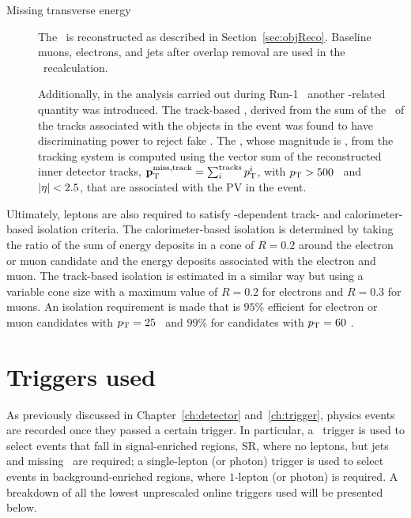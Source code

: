 \begin{description}
			\item[Missing transverse energy]
				The \met\ is reconstructed as described in Section~\ref{sec:objReco}. Baseline muons, electrons, and jets after overlap removal are used in the \met\ recalculation. 

				Additionally, in the analysis carried out during Run-1~\cite{stop0LRun1} another \met-related quantity was introduced. The track-based \met, derived from the sum of the \pt\ of the tracks associated with the objects in the event was found to have discriminating power to reject fake \met. The \ptmisstrk, whose magnitude is \mettrk, from the tracking system is computed using the vector sum of the reconstructed inner detector tracks, $\mathbf{p}_{\mathrm{T}}^{\mathrm{miss, track}} = \sum_i^{\mathrm{tracks}} p_{\mathrm{T}}^i$, with $p_{\mathrm{T}} > 500$ \MeV\ and $|\eta| < 2.5$, that are associated with the \ac{PV} in the event. 
 		\end{description}

		Ultimately, leptons are also required to satisfy \pt-dependent track- and calorimeter-based isolation criteria. The calorimeter-based isolation is determined by taking the ratio of the sum of energy deposits in a cone of $R = 0.2$ around the electron or muon candidate and the energy deposits associated with the electron and muon. The track-based isolation is estimated in a similar way but using a variable cone size with a maximum value of $R = 0.2$ for electrons and $R = 0.3$ for muons. An isolation requirement is made that is $95\%$ efficient for electron or muon candidates with $p_{\mathrm{T}} = 25$ \GeV\ and $99\%$ for candidates with $p_{\mathrm{T}} = 60$ \GeV.

		
	\section{Triggers used}

		As previously discussed in Chapter~\ref{ch:detector} and~\ref{ch:trigger}, physics events are recorded once they passed a certain trigger. In particular, a \met\ trigger is used to select events that fall in signal-enriched regions, \ac{SR}, where no leptons, but jets and missing \et\ are required; a single-lepton (or photon) trigger is used to select events in background-enriched regions, where $1$-lepton (or photon) is required. A breakdown of all the lowest unprescaled online triggers used will be presented below.

